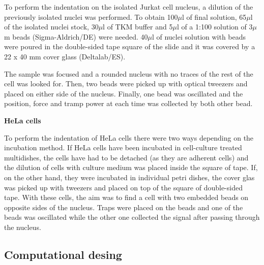 \documentclass[12pt, a4paper]{article} %
\begin{document}
To perform the indentation on the isolated Jurkat cell nucleus, a dilution of the previously isolated nuclei was performed. To obtain 100$\mu$l of final solution, 65$\mu$l of the isolated nuclei stock, 30$\mu$l of TKM buffer and 5$\mu$l of a 1:100 solution of 3$\mu$m beads (Sigma-Aldrich/DE) were needed. 40$\mu$l of nuclei solution with beads were poured in the double-sided tape square of the slide and it was covered by a 22 x 40 mm cover glass (Deltalab/ES).

\setlength{\parindent}{8pt}

The sample was focused and a rounded nucleus with no traces of the rest of the cell was looked for. Then, two beads were picked up with optical tweezers and placed on either side of the nucleus. Finally, one bead was oscillated and the position, force and tramp power at each time was collected by both other bead.

\setlength{\parindent}{0pt}

{\textbf{HeLa cells}}

To perform the indentation of HeLa cells there were two ways depending on the incubation method. If HeLa cells have been incubated in cell-culture treated multidishes, the cells have had to be detached (as they are adherent cells) and the dilution of cells with culture medium was placed inside the square of tape. If, on the other hand, they were incubated in individual petri dishes, the cover glas was picked up with tweezers and placed on top of the square of double-sided tape. With these cells, the aim was to find a cell with two embedded beads on opposite sides of the nucleus. Traps were placed on the beads and one of the beads was oscillated while the other one collected the signal after passing through the nucleus.

\setlength{\parindent}{8pt}

\setlength{\parskip}{0mm}

\subsection{Computational desing}

\end{document}
